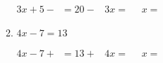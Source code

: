 \begin{enumerate}[label=\arabic*.]
\begin{enumerate}[label=\alph*)]
        \vspace{0.3cm}
        $3x + 5 - \phantom{0} = 20 - \phantom{0}$
        \vspace{0.3cm}
        $3x = \phantom{00}$
        \vspace{0.3cm}
        $x = $ \underline{\hspace{2cm}}

        \vspace{0.5cm}

        \item $4x - 7 = 13$

        \vspace{0.3cm}
        $4x - 7 + \phantom{0} = 13 + \phantom{0}$
        \vspace{0.3cm}
        $4x = \phantom{00}$
        \vspace{0.3cm}
        $x = $ \underline{\hspace{2cm}}

    \end{enumerate}

\end{enumerate}